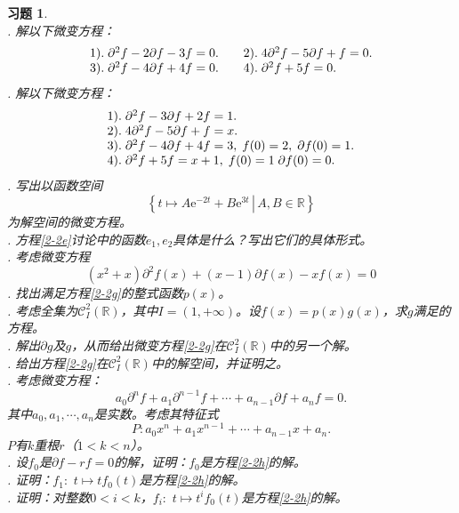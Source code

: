 \documentclass[12pt,UTF8]{ctexbook}
\newcommand{\e}{\mathrm{e}}
\theoremstyle{definition}
\theoremstyle{plain}
\newtheorem{xt}{习题}[section]
\begin{document}
\begin{xt}
    \mbox{} \\
    . 解以下微变方程：\\
    $$
    \begin{array}[]{ll}
        1).\;\partial^2 f - 2 \partial f - 3 f = 0. &\quad2).\; 4\partial^2 f - 5 \partial f + f = 0. \\
        3).\;\partial^2 f - 4 \partial f + 4 f = 0. &\quad4).\; \partial^2 f + 5 f = 0. 
    \end{array}
    $$
    . 解以下微变方程：\\
    $$
    \begin{array}[]{l}
        1).\;\partial^2 f - 3 \partial f + 2 f = 1. \\
        2).\; 4\partial^2 f - 5 \partial f + f = x. \\
        3).\;\partial^2 f - 4 \partial f + 4 f = 3, \; f(0) = 2,\; \partial f(0) = 1.\\
        4).\; \partial^2 f + 5 f = x + 1,\; f(0)=1\; \partial f(0) = 0. 
    \end{array}
    $$
    . 写出以函数空间
    $$ \left\{\left.t \mapsto A\e^{-2t} + B\e^{3t}\,\right|\, A, B \in \mathbb{R}\right\} $$
    为解空间的微变方程。\\
    . 方程\eqref{2-2e}讨论中的函数$e_1, e_2$具体是什么？写出它们的具体形式。\\
    . 考虑微变方程
    \begin{equation}
        (x^2 + x) \partial^2 f(x) + (x - 1) \partial f(x) - x f(x) = 0 \label{2-2g} \tag{a}
    \end{equation}
    . 找出满足方程\eqref{2-2g}的整式函数$p(x)$。\\
    . 考虑全集为$\mathcal{C}^2_{I}(\mathbb{R})$，其中$I = (1, +\infty)$。设$f(x) = p(x)g(x)$，求$g$满足的方程。\\
    . 解出$\partial g$及$g$，从而给出微变方程\eqref{2-2g}在$\mathcal{C}^2_{I}(\mathbb{R})$中的另一个解。\\
    . 给出方程\eqref{2-2g}在$\mathcal{C}^2_{I}(\mathbb{R})$中的解空间，并证明之。\\
    . 考虑微变方程：
    \begin{equation}
        a_0\partial^n f + a_1 \partial^{n-1} f + \cdots + a_{n-1}\partial f + a_n f = 0. \label{2-2h} \tag{b}
    \end{equation}
    其中$a_0, a_1, \cdots , a_n$是实数。考虑其特征式
    $$P: a_0x^n + a_1 x^{n-1} + \cdots + a_{n-1}x + a_n . $$
    $P$有$k$重根$r$（$1<k<n$）。\\
    . 设$f_0$是$\partial f - rf = 0$的解，证明：$f_0$是方程\eqref{2-2h}的解。\\
    . 证明：$f_1:\,\,t\mapsto tf_0(t)$是方程\eqref{2-2h}的解。\\
    . 证明：对整数$0<i<k$，$f_i:\,\,t\mapsto t^if_0(t)$是方程\eqref{2-2h}的解。
\end{xt}
\end{document}
